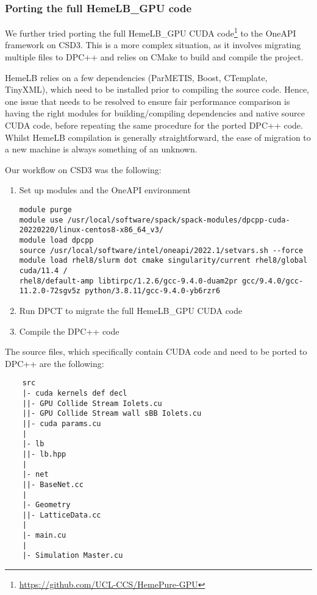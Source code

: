 \documentclass[../main]{subfiles}
\begin{document}
\subsubsection{Porting the full HemeLB\_GPU code}
We further tried porting the full HemeLB\_GPU CUDA code\footnote{\url{https://github.com/UCL-CCS/HemePure-GPU}} to the OneAPI framework on CSD3.
This is a more complex situation, as it involves migrating multiple files to DPC++ and relies on CMake to build and compile the project.

HemeLB relies on a few dependencies (ParMETIS, Boost, CTemplate, TinyXML), which need to be installed prior to compiling the source code.
Hence, one issue that needs to be resolved to ensure fair performance comparison is having the right modules for building/compiling dependencies and native source CUDA code, before repeating the same procedure for the ported DPC++ code.
Whilst HemeLB compilation is generally straightforward, the ease of migration to a new machine is always something of an unknown.

Our workflow on CSD3 was the following:
\begin{enumerate}
	\item Set up modules and the OneAPI environment
	      \begin{verbatim}
module purge
module use /usr/local/software/spack/spack-modules/dpcpp-cuda-20220220/linux-centos8-x86_64_v3/
module load dpcpp
source /usr/local/software/intel/oneapi/2022.1/setvars.sh --force
module load rhel8/slurm dot cmake singularity/current rhel8/global cuda/11.4 /
rhel8/default-amp libtirpc/1.2.6/gcc-9.4.0-duam2pr gcc/9.4.0/gcc-11.2.0-72sgv5z python/3.8.11/gcc-9.4.0-yb6rzr6
    \end{verbatim}
	\item Run DPCT to migrate the full HemeLB\_GPU CUDA code
	\item Compile the DPC++ code
\end{enumerate}


The source files, which specifically contain CUDA code and need to be ported to DPC++ are the following:
\begin{verbatim}
    src
    |- cuda kernels def decl
    ||- GPU Collide Stream Iolets.cu
    ||- GPU Collide Stream wall sBB Iolets.cu
    ||- cuda params.cu
    |
    |- lb
    ||- lb.hpp
    |
    |- net
    ||- BaseNet.cc
    |
    |- Geometry
    ||- LatticeData.cc
    |
    |- main.cu
    |
    |- Simulation Master.cu
\end{verbatim}
\end{document}
